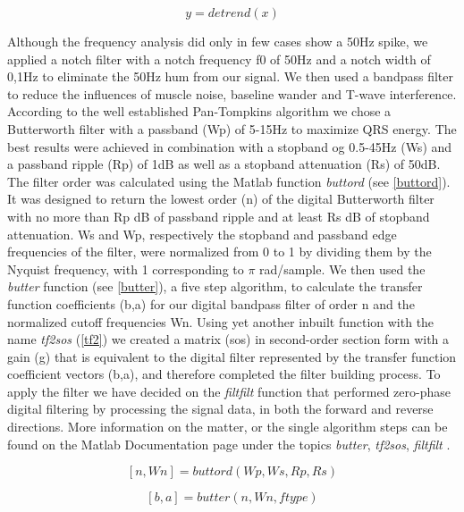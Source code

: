 \begin{equation}\label{detrend}
y = detrend(x)
\end{equation}

Although the frequency analysis did only in few cases show a 50Hz spike, we applied a notch filter with a notch frequency f0 of 50Hz and a notch width of 0,1Hz to eliminate the 50Hz hum from our signal. We then used a bandpass filter to reduce the influences of muscle noise, baseline wander and T-wave interference. According to the well established Pan-Tompkins algorithm \cite{PANTOM1985} we chose a Butterworth filter with a passband (Wp) of 5-15Hz to maximize QRS energy. The best results were achieved in combination with a stopband og 0.5-45Hz (Ws) and a passband ripple (Rp) of 1dB as well as a stopband attenuation (Rs) of 50dB. The filter order was calculated using the Matlab function \textit{buttord} (see \ref{buttord}). It was designed to return the lowest order (n) of the digital Butterworth filter with no more than Rp dB of passband ripple and at least Rs dB of stopband attenuation. Ws and Wp, respectively the stopband and passband edge frequencies of the filter, were normalized from 0 to 1 by dividing them by the Nyquist frequency, with 1 corresponding to $\pi$ rad/sample. We then used the \textit{butter}  function (see \ref{butter}), a five step algorithm, to calculate the transfer function coefficients (b,a) for our digital bandpass filter of order n and the normalized cutoff frequencies Wn. Using yet another inbuilt function with the name \textit{tf2sos} (\ref{tf2}) we created a matrix (sos) in second-order section form with a gain (g) that is equivalent to the digital filter represented by the transfer function coefficient vectors (b,a), and therefore completed the filter building process. To apply the filter we have decided on the \textit{filtfilt} function that performed zero-phase digital filtering by processing the signal data, in both the forward and reverse directions. More information on the matter, or the single algorithm steps can be found on the Matlab Documentation page under the topics \textit{butter}, \textit{tf2sos}, \textit{filtfilt} \cite{MATDOC}.  

\begin{equation}\label{buttord}
[n,Wn] = buttord(Wp,Ws,Rp,Rs)
\end{equation}

\begin{equation}\label{butter}
[b,a] = butter(n,Wn,ftype)
\end{equation}

